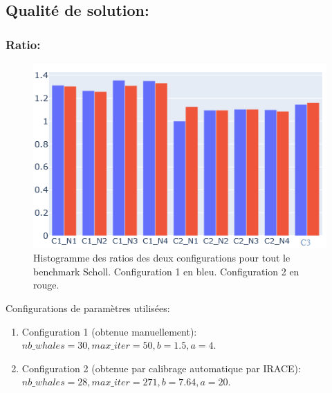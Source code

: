 \documentclass[12pt]{article}
\begin{document}
\subsection{Qualité de solution: }
\subsubsection{Ratio: }
\begin{figure}[!hbt]
    \includegraphics[width=\linewidth]{../figures/WOA/ratio_woa_configs.png}
    \caption{Histogramme des ratios des deux configurations pour tout le benchmark Scholl. Configuration 1 en bleu. Configuration 2 en rouge.}
\end{figure}
Configurations de paramètres utilisées:
\begin{enumerate}
    \item Configuration 1 (obtenue manuellement): \(nb\_whales=30, max\_iter=50, b=1.5, a=4\).
    \item Configuration 2 (obtenue par calibrage automatique par IRACE): \(nb\_whales=28, max\_iter=271,  b=7.64, a=20\).
\end{enumerate}
\end{document}
